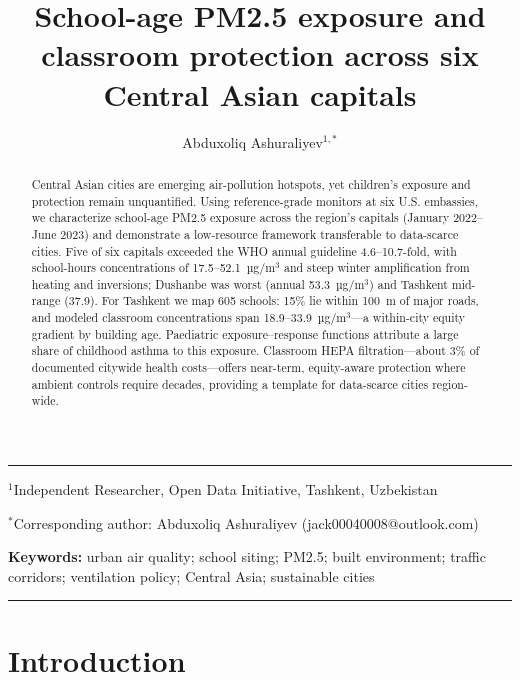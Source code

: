 \documentclass[11pt,a4paper]{article}
\title{\Large\textbf{School-age PM2.5 exposure and classroom protection across six Central Asian capitals}}
\author{Abduxoliq Ashuraliyev$^{1,*}$}
\date{}
\begin{document}
\maketitle

\vspace{-0.5cm}
\noindent\rule{\textwidth}{0.5pt}

\begin{center}
$^{1}$Independent Researcher, Open Data Initiative, Tashkent, Uzbekistan

$^{*}$Corresponding author: Abduxoliq Ashuraliyev (jack00040008@outlook.com)
\end{center}

\noindent\vspace{0.3cm}

\begin{abstract}
\noindent Central Asian cities are emerging air-pollution hotspots, yet children's exposure and protection remain unquantified. Using reference-grade monitors at six U.S. embassies, we characterize school-age PM2.5 exposure across the region's capitals (January 2022--June 2023) and demonstrate a low-resource framework transferable to data-scarce cities. Five of six capitals exceeded the WHO annual guideline 4.6--10.7-fold, with school-hours concentrations of 17.5--52.1~µg/m$^3$ and steep winter amplification from heating and inversions; Dushanbe was worst (annual 53.3~µg/m$^3$) and Tashkent mid-range (37.9). For Tashkent we map 605 schools: 15\% lie within 100~m of major roads, and modeled classroom concentrations span 18.9--33.9~µg/m$^3$---a within-city equity gradient by building age. Paediatric exposure--response functions attribute a large share of childhood asthma to this exposure. Classroom HEPA filtration---about 3\% of documented citywide health costs---offers near-term, equity-aware protection where ambient controls require decades, providing a template for data-scarce cities region-wide.
\end{abstract}

\noindent\textbf{Keywords:} urban air quality; school siting; PM2.5; built environment; traffic corridors; ventilation policy; Central Asia; sustainable cities

\vspace{0.5cm}
\noindent\rule{\textwidth}{0.5pt}

\section{Introduction}
\end{document}

